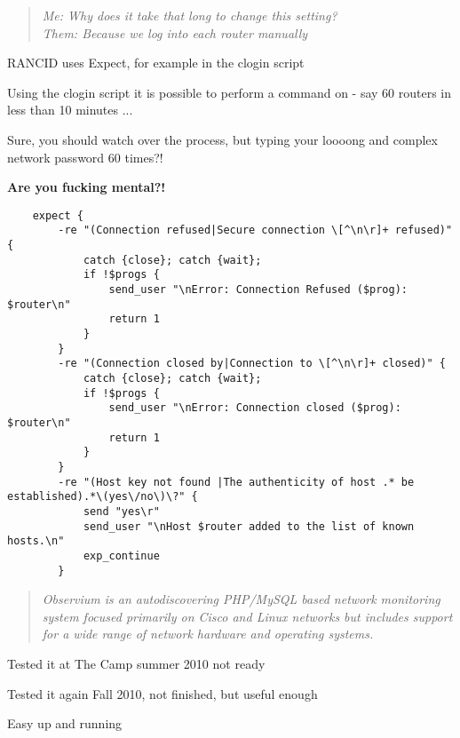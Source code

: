 \documentclass[28pt,landscape,a4paper,footrule]{foils}
\begin{document}

\begin{quote}
\it Me: Why does it take that long to change this setting?\\
Them: Because we log into each router manually
\end{quote}

\vskip 1cm
\begin{slidelist}
\item RANCID uses Expect, for example in the clogin script
\item Using the clogin script it is possible to perform a command on - say
60 routers in less than 10 minutes ...
\item Sure, you should watch over the process, but typing your loooong and complex network password 60 times?!
\end{slidelist}
\centerline{\bf Are you fucking mental?!}


\footnotesize
\begin{verbatim}
    expect {
        -re "(Connection refused|Secure connection \[^\n\r]+ refused)" {
            catch {close}; catch {wait};
            if !$progs {
                send_user "\nError: Connection Refused ($prog): $router\n"
                return 1
            }
        }
        -re "(Connection closed by|Connection to \[^\n\r]+ closed)" {
            catch {close}; catch {wait};
            if !$progs {
                send_user "\nError: Connection closed ($prog): $router\n"
                return 1
            }
        }
        -re "(Host key not found |The authenticity of host .* be established).*\(yes\/no\)\?" {
            send "yes\r"
            send_user "\nHost $router added to the list of known hosts.\n"
            exp_continue
        }
\end{verbatim}
\normalsize



\begin{quote}
\it Observium is an autodiscovering PHP/MySQL based network monitoring system focused primarily on Cisco and Linux networks but includes support for a wide range of network hardware and operating systems.
\end{quote}

\begin{slidelist}
\item Tested it at The Camp summer 2010 not ready
\item Tested it again Fall 2010, not finished, but useful enough
\item {}
\item Easy up and running\\
\end{slidelist}
\end{document}
